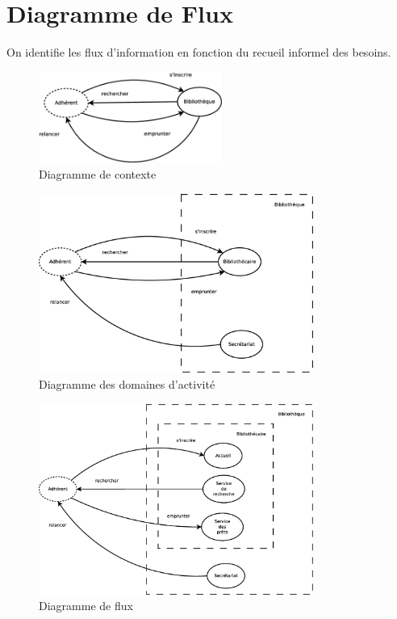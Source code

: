 \newpage
\section*{Diagramme de Flux}

On identifie les flux d'information en fonction du recueil informel des besoins.

\begin{figure}[!htb]
    \begin{center}
    \includegraphics[width=6cm]{images/cc1_df1.eps}
    \caption{\label{cc1_df1} Diagramme de contexte}
    \end{center}
\end{figure}

\begin{figure}[!htb]
    \begin{center}
    \includegraphics[width=9cm]{images/cc1_df2.eps}
    \caption{\label{cc1_df2} Diagramme des domaines d'activité}
    \end{center}
\end{figure}

\begin{figure}[!htb]
    \begin{center}
    \includegraphics[width=9cm]{images/cc1_df3.eps}
    \caption{\label{cc1_df3} Diagramme de flux}
    \end{center}
\end{figure}

